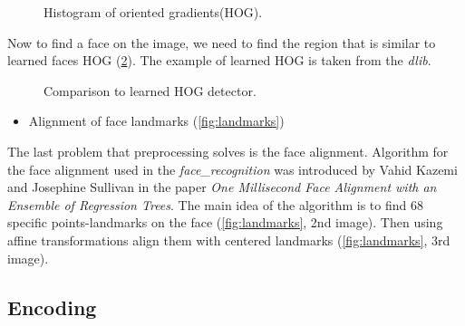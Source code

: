 \documentclass[hidelinks, english]{mvi-report}
\newcommand{\subimage}[3][1]{
\subfigure{
\texttt{[image: \#2.\#3]}
}
}
\begin{document}
    \begin{figure}[H]
        \centering
        \subimage[0.17]{gradient}{jpg}
        \subimage[0.03]{arrow}{png}
        \subimage[0.17]{hog}{jpg}
        \caption{Histogram of oriented gradients(HOG).}
        \label{fig:hog}
    \end{figure}


    \begin{figure*}[t]
        \centering
        \subimage[0.17]{tilted}{jpg}
        \subimage[0.03]{arrow}{png}
        \subimage[0.17]{landmarks_tilted}{jpg}
        \subimage[0.03]{multiply}{jpg}
        \subimage[0.17]{landmarks}{jpg}
        \subimage[0.03]{arrow}{png}
        \subimage[0.17]{landmarks_aligned}{jpg}
        \caption{Aligned face landmarks.}
        \label{fig:landmarks}
    \end{figure*}


    Now to find a face on the image, we need to find the region that is similar to learned faces HOG (\cref{fig:detected}).
    The example of learned HOG is taken from the \textit{dlib}\cite{generic-hog}.

    \begin{figure}[H]
        \centering
        \subimage[0.17]{detected}{jpg}
        \subimage[0.17]{hog_general}{png}
        \caption{Comparison to learned HOG detector.}
        \label{fig:detected}
    \end{figure}



    \begin{itemize}
        \item Alignment of face landmarks (\cref{fig:landmarks})
    \end{itemize}

    The last problem that preprocessing solves is the face alignment. Algorithm for the face alignment used
    in the \textit{face\_recognition} was introduced by Vahid Kazemi and Josephine Sullivan in the paper
    \textit{One Millisecond Face Alignment with an Ensemble of Regression Trees}\cite{face-alignment}. The main idea of the
    algorithm is to find 68 specific points-landmarks on the face (\cref{fig:landmarks}, 2nd image). Then using affine
    transformations align them with centered landmarks (\cref{fig:landmarks}, 3rd image).


    \subsection{Encoding}
\end{document}
